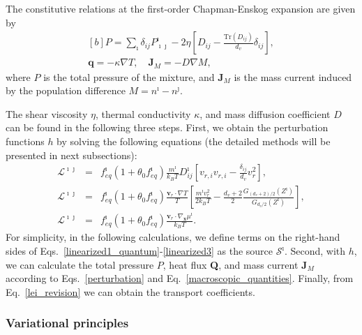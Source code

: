 The constitutive relations at the first-order Chapman-Enskog expansion are given by		
\begin{equation}\label{lei_revision}
\begin{aligned}[b]
P=\sum_{\imath}\delta_{ij}P^\imath_{\imath\jmath}-2\eta\left[D_{ij}-\frac{\text{Tr}(D_{ij})}{d_v}\delta_{ij}\right],\\
\textbf{q}=-\kappa\nabla{T},\quad
\textbf{J}_M=-D\nabla{M},
\end{aligned}
\end{equation}
where $P$ is the total pressure of the mixture, and $\textbf{J}_M$ is the mass current induced by the population difference $M=n^\imath-n^\jmath$. 



The shear viscosity $\eta$, thermal conductivity $\kappa$, and mass diffusion coefficient $D$ can be found in the following {\color{blue} three} steps. First, we obtain the perturbation functions $h$ by solving the following equations (the detailed methods will be presented in next subsections): 
\begin{eqnarray}
\mathcal{L}^{\imath\jmath}&=&f^\imath_{eq}(1+\theta_0f^\imath_{eq})\frac{m^\imath}{k_BT}D^\imath_{ij}\left[v_{r,i}v_{r,i}-\frac{\delta_{ij}}{d_v}v_r^2\right], \label{linearized1_quantum}\\
\mathcal{L}^{\imath\jmath}&=&f^\imath_{eq}(1+\theta_0f^\imath_{eq})\frac{\textbf{v}_{r}\cdot\nabla{}T}{T}\left[\frac{m^\imath{v_r^2}}{2k_BT}-\frac{d_v+2}{2}\frac{G_{(d_v+2)/2}(Z^\imath)}{G_{d_v/2}(Z^\imath)}\right], \label{linearized2_quantum}\\
\mathcal{L}^{\imath\jmath}&=&f^\imath_{eq}(1+\theta_0f^\imath_{eq})\frac{\textbf{v}_r\cdot\nabla_\textbf{x}\mu^\imath}{k_BT}. \label{linearized3}
\end{eqnarray}
For simplicity, in the following calculations, we define terms on the right-hand sides of Eqs.~\eqref{linearized1_quantum}-\eqref{linearized3} as the source $\mathcal{S}^\imath$. Second, with $h$, we can calculate the total pressure $P$, heat flux \textbf{Q}, and mass current $\textbf{J}_M$ according to  Eqs.~\eqref{perturbation} and Eq.~\eqref{macroscopic_quantities}. Finally, from Eq.~\eqref{lei_revision} we can obtain the transport coefficients.




\subsubsection{Variational principles}

